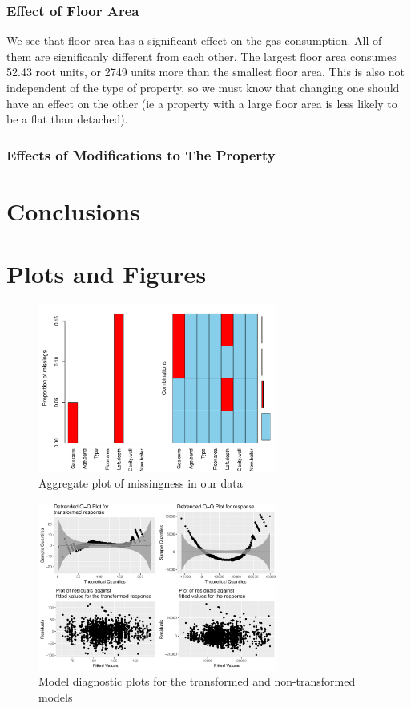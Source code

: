 \documentclass[9pt]{extarticle}
\begin{document}
\subsubsection{Effect of Floor Area}
We see that floor area has a significant effect on the gas consumption. All of them are significanly different from each other. The largest floor area consumes 52.43 root units, or 2749 units more than the smallest floor area. This is also not independent of the type of property, so we must know that changing one should have an effect on the other (ie a property with a large floor area is less likely to be a flat than detached).

\subsubsection{Effects of Modifications to The Property}
\section{Conclusions}



\appendix

\section{Plots and Figures}

\begin{figure}[H]
	\centering
	\includegraphics[width=0.7\textwidth]{aggre_missplot}
	\caption{Aggregate plot of missingness in our data}
	\label{fig:aggrmiss}
\end{figure}

\begin{figure}[H]
	\centering
	\includegraphics[width=0.7\textwidth]{qqplots}
	\caption{Model diagnostic plots for the transformed and non-transformed models}
	\label{fig:qqplots}
\end{figure}
\end{document}
